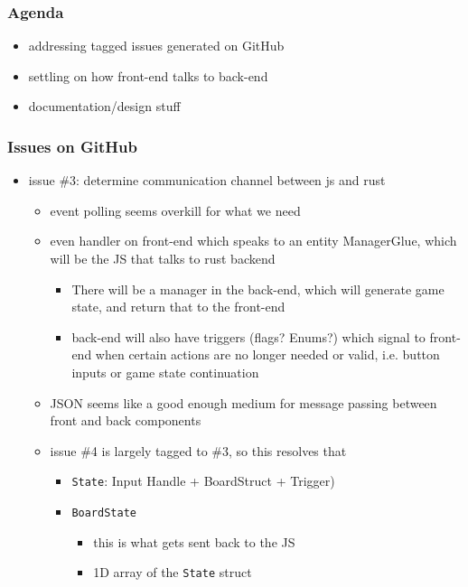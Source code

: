 \documentclass[11pt]{article}
\begin{document}
\subsubsection*{Agenda}
\label{sec:org1a6b801}
\begin{itemize}
\item addressing tagged issues generated on GitHub
\item settling on how front-end talks to back-end
\item documentation/design stuff
\end{itemize}
\subsubsection*{Issues on GitHub}
\label{sec:org6f5507f}
\begin{itemize}
\item issue \#3: determine communication channel between js and rust
\label{sec:org6ecb677}
\begin{itemize}
\item event polling seems overkill for what we need
\item even handler on front-end which speaks to an entity ManagerGlue, which will be the JS that
talks to rust backend
\begin{itemize}
\item There will be a manager in the back-end, which will generate game state, and return that to
the front-end
\item back-end will also have triggers (flags? Enums?) which signal to front-end when certain
actions are no longer needed or valid, i.e. button inputs or game state continuation
\end{itemize}
\item JSON seems like a good enough medium for message passing between front and back components
\end{itemize}
\begin{itemize}
\item issue \#4 is largely tagged to \#3, so this resolves that
\label{sec:orgeb3dd6d}
\begin{itemize}
\item \texttt{State}: Input Handle + BoardStruct + Trigger)
\item \texttt{BoardState}
\begin{itemize}
\item this is what gets sent back to the JS
\item 1D array of the \texttt{State} struct
\begin{itemize}

\end{itemize}
\end{itemize}
\end{itemize}
\end{itemize}
\end{itemize}
\end{document}
